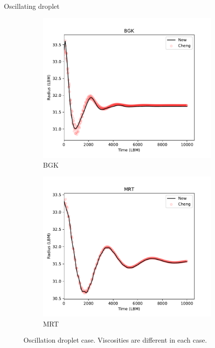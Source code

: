 \documentclass{beamer}
\begin{document}
	\begin{frame}{Oscillating droplet}
		\begin{figure}[h]
			\centering
			\begin{subfigure}{.5\textwidth}
				\centering
				\includegraphics[width=.9\linewidth]{pics/BGKOsc.pdf}
				\caption{BGK}
				\label{fig:sub1}
			\end{subfigure}%
			\begin{subfigure}{.5\textwidth}
				\centering
				\includegraphics[width=.9\linewidth]{pics/MRTOsc.pdf}
				\caption{MRT}
				\label{fig:sub2}
			\end{subfigure}
			\caption{Oscillation droplet case. Viscosities are different in each case.}
			\label{fig:osci}
		\end{figure}
	\end{frame}
\end{document}
